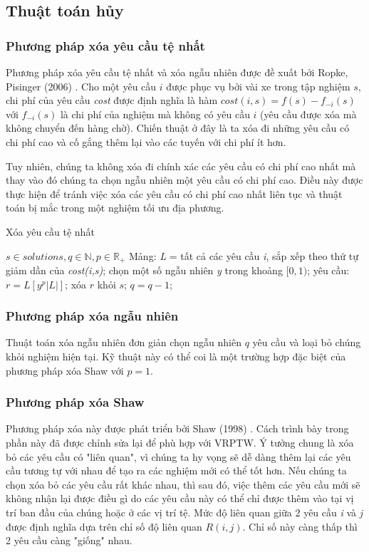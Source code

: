 \subsection{Thuật toán hủy}

\subsubsection*{Phương pháp xóa yêu cầu tệ nhất} 
Phương pháp xóa yêu cầu tệ nhất và xóa ngẫu nhiên được đề xuất bởi Ropke, Pisinger (2006) \cite{ropke2006adaptive}. Cho một yêu cầu $i$ được phục vụ bởi vài xe trong tập nghiệm $s$, chi phí của yêu cầu \textit{cost} được định nghĩa là hàm $cost(i,s)=f(s)-f_{-i}(s)$ với $f_{-i}(s)$ là chi phí của nghiệm mà không có yêu cầu $i$ (yêu cầu được xóa mà không chuyển đến hàng chờ). Chiến thuật ở đây là ta xóa đi những yêu cầu có chi phí cao và cố gắng thêm lại vào các tuyến với chi phí ít hơn.

Tuy nhiên, chúng ta không xóa đi chính xác các yêu cầu có chi phí cao nhất mà thay vào đó chúng ta chọn ngẫu nhiên một yêu cầu có chi phí cao. Điều này được thực hiện để tránh việc xóa các yêu cầu có chi phí cao nhất liên tục và thuật toán bị mắc trong một nghiệm tối ưu địa phương.

\begin{algorithm}
	\label{alg:worst_removal}
	\caption{Xóa yêu cầu tệ nhất}
	\begin{algorithmic}[1]
		\Require $s \in {solutions}, q \in \mathbb{N}, p \in \mathbb{R}_{+}$
		\State Mảng: \textit{L} = tất cả các yêu cầu \textit{i}, sắp xếp theo thứ tự giảm dần của \textit{cost(i,s)};
		\State chọn một số ngẫu nhiên \textit{y} trong khoảng $[0, 1)$;
		\State yêu cầu: $r = L\left[ y^p |L| \right]$;
		\State xóa $r$ khỏi $s$;
		\State $q = q-1$;
		\EndWhile
	\end{algorithmic}
\end{algorithm}

\subsubsection*{Phương pháp xóa ngẫu nhiên}
Thuật toán xóa ngẫu nhiên đơn giản chọn ngẫu nhiên $q$ yêu cầu và loại bỏ chúng khỏi nghiệm hiện tại. Kỹ thuật này có thể coi là một trường hợp đặc biệt của phương pháp xóa Shaw với $p=1$.

\subsubsection*{Phương pháp xóa Shaw}
Phương pháp xóa này được phát triển bởi Shaw (1998) \cite{shaw1998using}. Cách trình bày trong phần này đã được chỉnh sửa lại để phù hợp với VRPTW. Ý tưởng chung là xóa bỏ các yêu cầu có "liên quan", vì chúng ta hy vọng sẽ dễ dàng thêm lại các yêu cầu tương tự với nhau để tạo ra các nghiệm mới có thể tốt hơn. Nếu chúng ta chọn xóa bỏ các yêu cầu rất khác nhau, thì sau đó, việc thêm các yêu cầu mới sẽ không nhận lại được điều gì do các yêu cầu này có thể chỉ được thêm vào tại vị trí ban đầu của chúng hoặc ở các vị trí tệ. Mức độ liên quan giữa 2 yêu cầu \textit{i} và \textit{j} được định nghĩa dựa trên chỉ số độ liên quan $R(i,j)$. Chỉ số này càng thấp thì 2 yêu cầu càng "giống" nhau.


